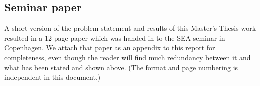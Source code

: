 \documentclass{cslthse-msc}
\begin{document}
\begin{appendices}
 
 \chapter{Seminar paper}
 A short version of the problem statement and results of this Master's Thesis work resulted in a 12-page paper which was handed in to the SEA seminar in Copenhagen. We attach that paper as an appendix to this report for completeness, even though the reader will find much redundancy between it and what has been stated and shown above. (The format and page numbering is independent in this document.)
 
 
 
\end{appendices}
\end{document}
